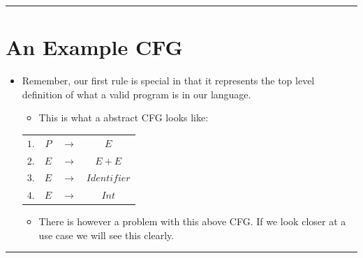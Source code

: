 \documentclass{article}
\begin{document}
\hrule

\section{An Example CFG}
\begin{itemize}
	\item Remember, our first rule is special in that it represents the top level definition of what a valid program is in our
		language.
	\begin{itemize}
		\item This is what a abstract CFG looks like:
	\end{itemize}
	\begin{center}
		\begin{tabular}{ |c c c c| }
			\hline
			$1.$ & $P$ & ${\rightarrow}$ & $E$ \\
			$2.$ & $E$ & ${\rightarrow}$ & $E+E$ \\
			$3.$ & $E$ & ${\rightarrow}$ & $Identifier$ \\
			$4.$ & $E$ & ${\rightarrow}$ & $Int$ \\
			\hline
		\end{tabular}
	\end{center}
	\begin{itemize}
		\item There is however a problem with this above CFG. If we look closer at a use case we will see this clearly.
	\end{itemize}
\end{itemize}

\hrule
\end{document}
